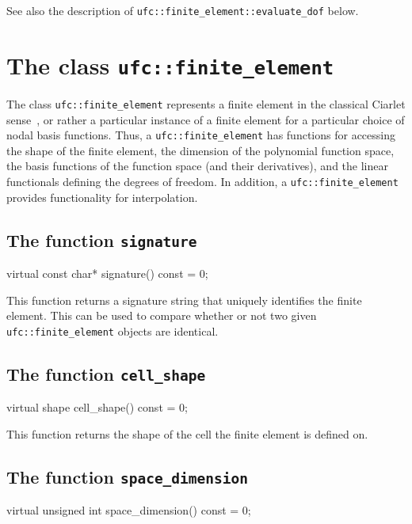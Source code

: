 See also the description of
\texttt{ufc::finite\_element::evaluate\_dof} below.

\section{The class \texttt{ufc::finite\_element}}

The class \texttt{ufc::finite\_element} represents a finite element in
the classical Ciarlet sense~\cite{Cia78}, or rather a particular
instance of a finite element for a particular choice of nodal basis
functions. Thus, a \texttt{ufc::finite\_element} has functions for
accessing the shape of the finite element, the dimension of the
polynomial function space, the basis functions of the function space
(and their derivatives), and the linear functionals defining the
degrees of freedom. In addition, a \texttt{ufc::finite\_element}
provides functionality for interpolation.

\subsection{The function \texttt{signature}}

\begin{code}
virtual const char* signature() const = 0;
\end{code}

This function returns a signature string that uniquely identifies the
finite element. This can be used to compare whether or not two given
\texttt{ufc::fi\-nite\_element} objects are identical.

\subsection{The function \texttt{cell\_shape}}

\begin{code}
virtual shape cell_shape() const = 0;
\end{code}

This function returns the shape of the cell the finite element is
defined on.

\subsection{The function \texttt{space\_dimension}}

\begin{code}
virtual unsigned int space_dimension() const = 0;
\end{code}


